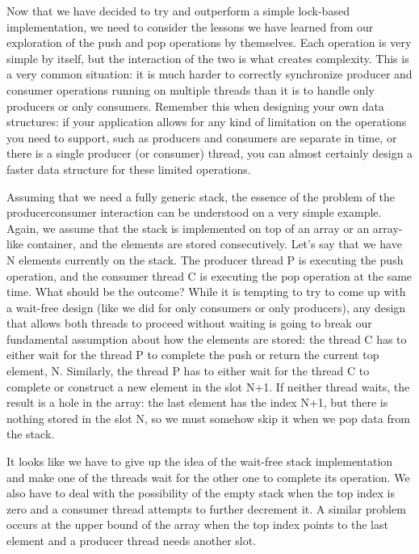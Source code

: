 
Now that we have decided to try and outperform a simple lock-based implementation, we need to consider the lessons we have learned from our exploration of the push and pop operations by themselves. Each operation is very simple by itself, but the interaction of the two is what creates complexity. This is a very common situation: it is much harder to correctly synchronize producer and consumer operations running on multiple threads than it is to handle only producers or only consumers. Remember this when designing your own data structures: if your application allows for any kind of limitation on the operations you need to support, such as producers and consumers are separate in time, or there is a single producer (or consumer) thread, you can almost certainly design a faster data structure for these limited operations.

Assuming that we need a fully generic stack, the essence of the problem of the producerconsumer interaction can be understood on a very simple example. Again, we assume that the stack is implemented on top of an array or an array-like container, and the elements are stored consecutively. Let's say that we have N elements currently on the stack. The producer thread P is executing the push operation, and the consumer thread C is executing the pop operation at the same time. What should be the outcome? While it is tempting to try to come up with a wait-free design (like we did for only consumers or only producers), any design that allows both threads to proceed without waiting is going to break our fundamental assumption about how the elements are stored: the thread C has to either wait for the thread P to complete the push or return the current top element, N. Similarly, the thread P has to either wait for the thread C to complete or construct a new element in the slot N+1. If neither thread waits, the result is a hole in the array: the last element has the index N+1, but there is nothing stored in the slot N, so we must somehow skip it when we pop data from the stack.

It looks like we have to give up the idea of the wait-free stack implementation and make one of the threads wait for the other one to complete its operation. We also have to deal with the possibility of the empty stack when the top index is zero and a consumer thread attempts to further decrement it. A similar problem occurs at the upper bound of the array when the top index points to the last element and a producer thread needs another slot.


